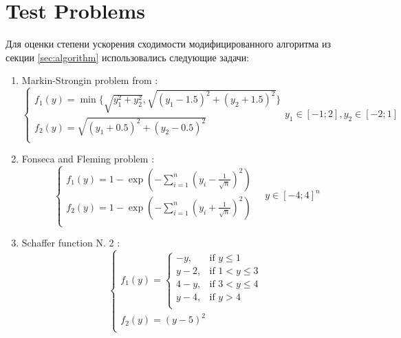 \documentclass{llncs}
\begin{document}
\section{Test Problems}
\label{sec:test_problems}
Для оценки степени ускорения сходимости модифицированного алгоритма из секции \ref{sec:algorithm} использовались следующие задачи:
\begin{enumerate}
  \item Markin-Strongin problem from \cite{markinStrongin1993}:
    \begin{equation}
      \left \{
      \begin{array}{l}
        f_1(y) = \min\{\sqrt{y_1^2+y_2^2},\sqrt{(y_1-1.5)^2+(y_2+1.5)^2}\} \\
        f_2(y)=\sqrt{(y_1+0.5)^2+(y_2-0.5)^2} \\
      \end{array}
      \right .
      y_1\in [-1;2],y_2\in [-2;1]
    \end{equation}
  \item Fonseca and Fleming problem \cite{Huband2006}:
  \begin{equation}
    \label{eq:fonseca}
    \left \{
    \begin{array}{l}
      f_{1}\left(y\right) = 1 - \exp \left(-\sum_{i=1}^{n} \left(y_{i} - \frac{1}{\sqrt{n}} \right)^{2} \right) \\
      f_{2}\left(y\right) = 1 - \exp \left(-\sum_{i=1}^{n} \left(y_{i} + \frac{1}{\sqrt{n}} \right)^{2} \right) \\
    \end{array}
    \right .
    \quad y\in [-4;4]^n
  \end{equation}
  \item Schaffer function N. 2 \cite{Huband2006}:
    \begin{equation}
      \label{eq:schaffer2}
      \left \{
      \begin{array}{l}
        f_1(y) = \begin{cases}
                  -y,   & \text{if } y \leqslant 1 \\
                   y-2, & \text{if } 1 < y \leqslant 3 \\
                   4-y, & \text{if } 3 < y \leqslant 4 \\
                   y-4, & \text{if } y > 4 \\
                \end{cases} \\
        f_2(y) = (y-5)^2\\

\end{array}
\end{equation}
\end{enumerate}
\end{document}
